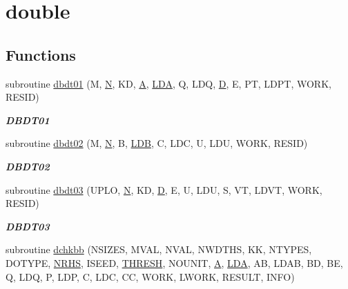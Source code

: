 \hypertarget{group__double__eig}{}\section{double}
\label{group__double__eig}
\subsection*{Functions}
\begin{DoxyCompactItemize}
\item 
subroutine \hyperlink{group__double__eig_ga4281d345e520762c2b713861a36db678}{dbdt01} (M, \hyperlink{polmisc_8c_a0240ac851181b84ac374872dc5434ee4}{N}, K\+D, \hyperlink{classA}{A}, \hyperlink{example__user_8c_ae946da542ce0db94dced19b2ecefd1aa}{L\+D\+A}, Q, L\+D\+Q, \hyperlink{odrpack_8h_a7dae6ea403d00f3687f24a874e67d139}{D}, E, P\+T, L\+D\+P\+T, W\+O\+R\+K, R\+E\+S\+I\+D)
\begin{DoxyCompactList}\small\item\em {\bfseries D\+B\+D\+T01} \end{DoxyCompactList}\item 
subroutine \hyperlink{group__double__eig_ga4300a964c1dd20239562d1c58a1c8a69}{dbdt02} (M, \hyperlink{polmisc_8c_a0240ac851181b84ac374872dc5434ee4}{N}, B, \hyperlink{example__user_8c_a50e90a7104df172b5a89a06c47fcca04}{L\+D\+B}, C, L\+D\+C, U, L\+D\+U, W\+O\+R\+K, R\+E\+S\+I\+D)
\begin{DoxyCompactList}\small\item\em {\bfseries D\+B\+D\+T02} \end{DoxyCompactList}\item 
subroutine \hyperlink{group__double__eig_ga6c6578f36abb99e08a2b08611468074f}{dbdt03} (U\+P\+L\+O, \hyperlink{polmisc_8c_a0240ac851181b84ac374872dc5434ee4}{N}, K\+D, \hyperlink{odrpack_8h_a7dae6ea403d00f3687f24a874e67d139}{D}, E, U, L\+D\+U, S, V\+T, L\+D\+V\+T, W\+O\+R\+K, R\+E\+S\+I\+D)
\begin{DoxyCompactList}\small\item\em {\bfseries D\+B\+D\+T03} \end{DoxyCompactList}\item 
subroutine \hyperlink{group__double__eig_gad3ec9fc9822df7885e553241df6b3171}{dchkbb} (N\+S\+I\+Z\+E\+S, M\+V\+A\+L, N\+V\+A\+L, N\+W\+D\+T\+H\+S, K\+K, N\+T\+Y\+P\+E\+S, D\+O\+T\+Y\+P\+E, \hyperlink{example__user_8c_aa0138da002ce2a90360df2f521eb3198}{N\+R\+H\+S}, I\+S\+E\+E\+D, \hyperlink{zlaqgs_8c_a0656018abfc9fa2821827415f5d5ea57}{T\+H\+R\+E\+S\+H}, N\+O\+U\+N\+I\+T, \hyperlink{classA}{A}, \hyperlink{example__user_8c_ae946da542ce0db94dced19b2ecefd1aa}{L\+D\+A}, A\+B, L\+D\+A\+B, B\+D, B\+E, Q, L\+D\+Q, P, L\+D\+P, C, L\+D\+C, C\+C, W\+O\+R\+K, L\+W\+O\+R\+K, R\+E\+S\+U\+L\+T, I\+N\+F\+O)

\end{DoxyCompactItemize}
